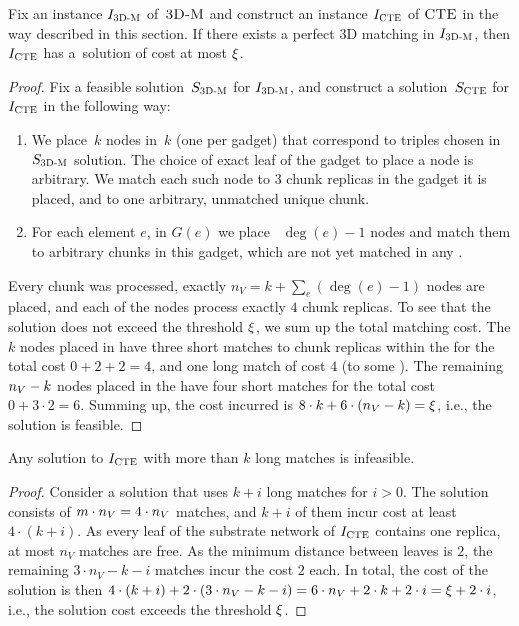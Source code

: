 \begin{lemma}
  Fix an instance $I_{\mathrm{\textsc{3D-M}}}$ of~$\textsc{3D-M}$ and construct an instance $I_{\mathrm{\textsc{CTE}}}$ of $\textsc{CTE}$ in the way described in this section.
  If there exists a perfect 3D matching in $I_{\mathrm{\textsc{3D-M}}}$, then $I_{\mathrm{\textsc{CTE}}}$ has a~solution of cost at most $\xi$.
    \label{lem:ma-reduction-left}
\end{lemma}
\begin{proof}
  Fix a feasible solution~$S_{\mathrm{\textsc{3D-M}}}$ for $I_{\mathrm{\textsc{3D-M}}}$, and construct a solution~$S_{\mathrm{\textsc{CTE}}}$ for $I_{\mathrm{\textsc{CTE}}}$ in the following way:
  \begin{enumerate}
    \item We place~$k$ nodes in~$k$ {\TripleGadgets} (one per gadget) that correspond to triples chosen in~$S_{\mathrm{\textsc{3D-M}}}$ solution.
    The choice of exact leaf of the gadget to place a node is arbitrary.
    We match each such node to $3$ chunk replicas in the gadget it is placed, and to one arbitrary, unmatched unique chunk.
    \item For each element $e$, in $G(e)$ we place
   ~$\deg(e) - 1$ nodes and match them to arbitrary chunks in this
    gadget, which are not yet matched in any {\TripleGadget}.
  \end{enumerate}

  Every chunk was processed, exactly $n_V = k + \sum_e(\deg(e) - 1)$ nodes are placed, and each of the nodes process exactly $4$ chunk replicas.
  To see that the solution does not exceed the threshold $\xi$, we sum up the total matching cost.
  The $k$ nodes placed in \TripleGadgets{} have three short matches to chunk replicas within the \TripleGadget{} for the total cost $0+2+2=4$, and one long match of cost $4$ (to some \UnqGadget{}).
  The remaining $n_V-k$ nodes placed in the \CoverSubtree{} have four short matches for the total cost $0+3\cdot 2 = 6$.
  Summing up, the cost incurred is $8\cdot k + 6\cdot (n_V - k) = \xi$, i.e., the solution is feasible.
\end{proof}


  \begin{lemma}
    Any solution to $I_{\mathrm{\textsc{CTE}}}$ with more than $k$ long matches is infeasible.
    \label{lem:infeasible}
  \end{lemma}
  \begin{proof}
    Consider a solution that uses $k+i$ long matches for $i>0$.
    The solution consists of $m \cdot n_V = 4\cdot n_V$ matches, and $k+i$ of them incur cost at least $4\cdot (k+i)$.
    As every leaf of the substrate network of $I_{\mathrm{\textsc{CTE}}}$ contains one replica, at most $n_V$ matches are free.
    As the minimum distance between leaves is $2$, the remaining $3\cdot n_V - k-i$ matches incur the cost $2$ each.
    In total, the cost of the solution is then $4\cdot (k+i) + 2\cdot (3\cdot n_V - k-i) = 6\cdot n_V + 2\cdot k + 2\cdot i = \xi + 2\cdot i$, i.e., the solution cost exceeds the threshold $\xi$.
  \end{proof}

